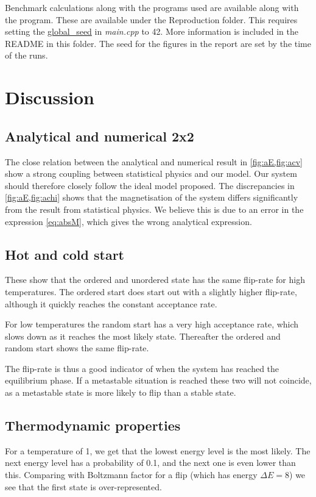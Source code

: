 \documentclass[11pt,a4paper,final]{article}
\numberwithin{equation}{section}
\begin{document}
Benchmark calculations along with the programs used are available 
along with the program. These are available under the Reproduction folder.
This requires setting the 
\url{global_seed} in \emph{main.cpp} to 42. More information is included
in the README in this folder. The seed for the figures in the report are 
set by the time of the runs.

\section{Discussion}

\subsection{Analytical and numerical 2x2}

The close relation between the analytical and numerical result in 
\cref{fig:aE,fig:acv} show a strong coupling between statistical 
physics and our model. Our system should therefore closely follow 
the ideal model proposed. The discrepancies in \cref{fig:aE,fig:achi}
shows that the magnetisation of the system differs significantly 
from the result from statistical physics. We believe this is due to an 
error in the expression \ref{eq:absM}, which gives the wrong analytical 
expression.


\subsection{Hot and cold start}
These show that the ordered and unordered state has the same flip-rate for 
high temperatures. The ordered start does start out with a slightly higher
flip-rate, although it quickly reaches the constant acceptance rate.

For low temperatures the random start has a very high
acceptance rate, which slows down as it reaches the most likely state.
Thereafter the ordered and random start shows the same flip-rate.

The flip-rate is thus a good indicator of when the system has reached the 
equilibrium phase. If a metastable situation is reached these two will 
not coincide, as a metastable state is more likely to flip than a stable
state.

\subsection{Thermodynamic properties}
For a temperature of 1, we get that
the lowest energy level is the most likely. The next energy level has a 
probability of 0.1, and the next one is even lower than this. 
Comparing with Boltzmann factor for a flip (which has energy 
$\Delta E = 8$) we see that the first state is over-represented.
\end{document}
